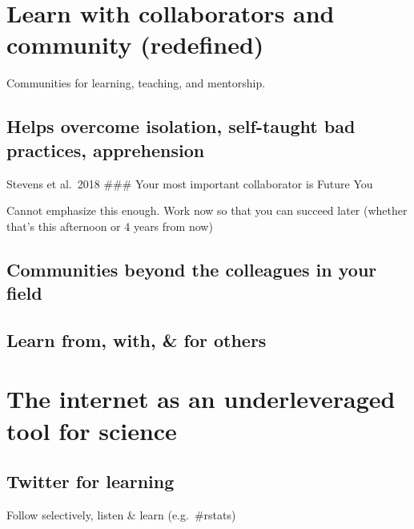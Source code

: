 \documentclass[
  letterpaper,
  DIV=11,
  numbers=noendperiod]{scrreprt}
\begin{document}
\hypertarget{learn-with-collaborators-and-community-redefined}{%
\section{Learn with collaborators and community
(redefined)}\label{learn-with-collaborators-and-community-redefined}}

Communities for learning, teaching, and mentorship.

\hypertarget{helps-overcome-isolation-self-taught-bad-practices-apprehension}{%
\subsection{Helps overcome isolation, self-taught bad practices,
apprehension}\label{helps-overcome-isolation-self-taught-bad-practices-apprehension}}

Stevens et al.~2018 \#\#\# Your most important collaborator is Future
You

Cannot emphasize this enough. Work now so that you can succeed later
(whether that's this afternoon or 4 years from now)

\hypertarget{communities-beyond-the-colleagues-in-your-field}{%
\subsection{Communities beyond the colleagues in your
field}\label{communities-beyond-the-colleagues-in-your-field}}

\hypertarget{learn-from-with-for-others}{%
\subsection{Learn from, with, \& for
others}\label{learn-from-with-for-others}}

\hypertarget{the-internet-as-an-underleveraged-tool-for-science}{%
\section{The internet as an underleveraged tool for
science}\label{the-internet-as-an-underleveraged-tool-for-science}}

\hypertarget{twitter-for-learning}{%
\subsection{Twitter for learning}\label{twitter-for-learning}}

Follow selectively, listen \& learn (e.g.~\#rstats)
\end{document}
